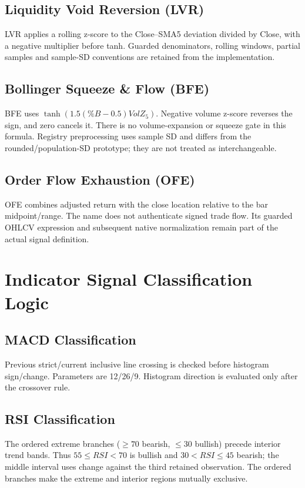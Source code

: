 \subsection{Liquidity Void Reversion (LVR)}
LVR applies a rolling z-score to the Close--SMA5 deviation divided by Close, with a negative multiplier before tanh. Guarded denominators, rolling windows, partial samples and sample-SD conventions are retained from the implementation.

\subsection{Bollinger Squeeze \& Flow (BFE)}
BFE uses $\tanh(1.5(\%B-0.5)VolZ_5)$. Negative volume z-score reverses the sign, and zero cancels it. There is no volume-expansion or squeeze gate in this formula. Registry preprocessing uses sample SD and differs from the rounded/population-SD prototype; they are not treated as interchangeable.

\subsection{Order Flow Exhaustion (OFE)}
OFE combines adjusted return with the close location relative to the bar midpoint/range. The name does not authenticate signed trade flow. Its guarded OHLCV expression and subsequent native normalization remain part of the actual signal definition.

\FloatBarrier
\setcounter{table}{0}
\section{Indicator Signal Classification Logic}
\label{app:indicator_logic}

\subsection{MACD Classification}
Previous strict/current inclusive line crossing is checked before histogram sign/change. Parameters are 12/26/9. Histogram direction is evaluated only after the crossover rule.
\subsection{RSI Classification}
The ordered extreme branches ($\ge70$ bearish, $\le30$ bullish) precede interior trend bands. Thus $55\le RSI<70$ is bullish and $30<RSI\le45$ bearish; the middle interval uses change against the third retained observation. The ordered branches make the extreme and interior regions mutually exclusive.
